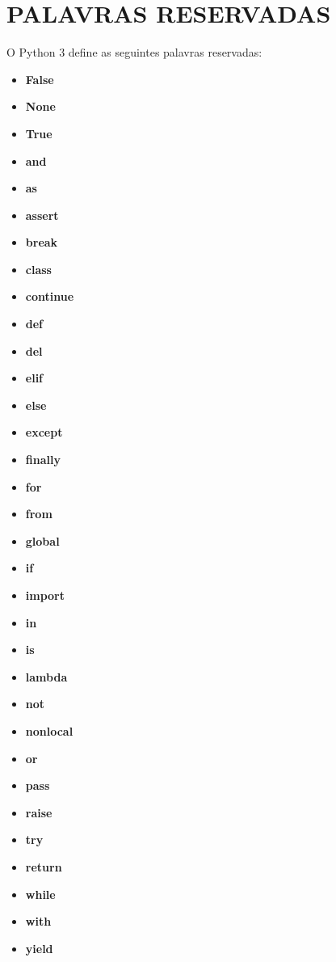 \section{PALAVRAS RESERVADAS}
O Python 3 define as seguintes palavras reservadas:
\begin{itemize}
    \item \textbf{False}
    \item \textbf{None}
    \item \textbf{True}
    \item \textbf{and}
    \item \textbf{as}
    \item \textbf{assert}
    \item \textbf{break}
    \item \textbf{class}
    \item \textbf{continue}
    \item \textbf{def}
    \item \textbf{del}
    \item \textbf{elif}
    \item \textbf{else}
    \item \textbf{except}
    \item \textbf{finally}
    \item \textbf{for}
    \item \textbf{from}
    \item \textbf{global}
    \item \textbf{if}
    \item \textbf{import}
    \item \textbf{in}
    \item \textbf{is}
    \item \textbf{lambda}
    \item \textbf{not}
    \item \textbf{nonlocal}
    \item \textbf{or}
    \item \textbf{pass}
    \item \textbf{raise}
    \item \textbf{try}
    \item \textbf{return}
    \item \textbf{while}
    \item \textbf{with}
    \item \textbf{yield}
\end{itemize}

